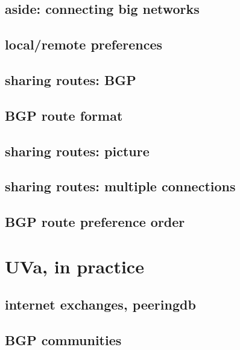 \subsection{aside: connecting big networks}


\subsection{local/remote preferences}


\subsection{sharing routes: BGP}


\subsection{BGP route format}


\subsection{sharing routes: picture}


\subsection{sharing routes: multiple connections}


\subsection{BGP route preference order}

\section{UVa, in practice}


\subsection{internet exchanges, peeringdb}


\subsection{BGP communities}


